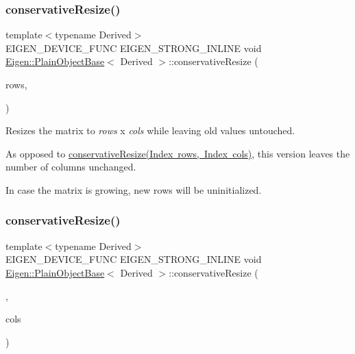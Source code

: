\subsubsection{\texorpdfstring{conservativeResize()}{conservativeResize()}\hspace{0.1cm}{\footnotesize\ttfamily [2/4]}}
{\footnotesize\ttfamily template$<$typename Derived$>$ \\
E\+I\+G\+E\+N\+\_\+\+D\+E\+V\+I\+C\+E\+\_\+\+F\+U\+NC E\+I\+G\+E\+N\+\_\+\+S\+T\+R\+O\+N\+G\+\_\+\+I\+N\+L\+I\+NE void \mbox{\hyperlink{class_eigen_1_1_plain_object_base}{Eigen\+::\+Plain\+Object\+Base}}$<$ Derived $>$\+::conservative\+Resize (\begin{DoxyParamCaption}\item[{Index}]{rows,  }\item[{No\+Change\+\_\+t}]{ }\end{DoxyParamCaption})\hspace{0.3cm}{\ttfamily [inline]}}

Resizes the matrix to {\itshape rows} x {\itshape cols} while leaving old values untouched.

As opposed to \mbox{\hyperlink{class_eigen_1_1_plain_object_base_a5e06c62950ba98fe8ba9c7d4be9c19e4}{conservative\+Resize(\+Index rows, Index cols)}}, this version leaves the number of columns unchanged.

In case the matrix is growing, new rows will be uninitialized. \mbox{\label{class_eigen_1_1_plain_object_base_a46afa73816539b0fe36c6e9abd7978a6}} 
\subsubsection{\texorpdfstring{conservativeResize()}{conservativeResize()}\hspace{0.1cm}{\footnotesize\ttfamily [3/4]}}
{\footnotesize\ttfamily template$<$typename Derived$>$ \\
E\+I\+G\+E\+N\+\_\+\+D\+E\+V\+I\+C\+E\+\_\+\+F\+U\+NC E\+I\+G\+E\+N\+\_\+\+S\+T\+R\+O\+N\+G\+\_\+\+I\+N\+L\+I\+NE void \mbox{\hyperlink{class_eigen_1_1_plain_object_base}{Eigen\+::\+Plain\+Object\+Base}}$<$ Derived $>$\+::conservative\+Resize (\begin{DoxyParamCaption}\item[{No\+Change\+\_\+t}]{,  }\item[{Index}]{cols }\end{DoxyParamCaption})\hspace{0.3cm}{\ttfamily [inline]}}

